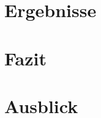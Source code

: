 \documentclass[
	12pt, %
	a4paper,
	listof=totoc, %
	bibliography=totoc, %
	numbers=noenddot, %
	ngerman, %
	headsepline, %
	oneside %
	]{scrbook} %
\begin{document}
\chapter{Ergebnisse}

\chapter{Fazit}


\chapter{Ausblick}







%
\end{document}
